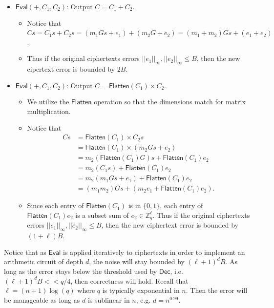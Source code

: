 \documentclass[12pt]{tufte-book}
\begin{document}
\begin{itemize}
    \item $\mathsf{Eval}(+, C_1, C_2)$: Output $C = C_1 + C_2$. 

    \begin{itemize}
        \item Notice that $Cs = C_1s + C_2s = (m_1 Gs + e_1) + (m_2 G + e_2) = (m_1 + m_2) Gs + (e_1 + e_2)$. 

        \item Thus if the original ciphertexts errors $||e_1||_{\infty}, ||e_2||_{\infty} \leq B$, then the new cipertext error is bounded by $2B$. 
    \end{itemize} 

    \item $\mathsf{Eval}(+, C_1, C_2)$: Output $C = \mathsf{Flatten}(C_1) \times C_2$. 

    \begin{itemize}
        \item We utilize the $\mathsf{Flatten}$ operation so that the dimensions match for matrix multiplication. 

        \item Notice that 
        \begin{align*}
            Cs & = \mathsf{Flatten}(C_1) \times C_2 s \\
            & = \mathsf{Flatten}(C_1) \times (m_2 G s + e_2) \\ 
            & = m_2 (\mathsf{Flatten}(C_1) G) s + \mathsf{Flatten}(C_1) e_2 \\ 
            & = m_2 (C_1 s) + \mathsf{Flatten}(C_1) e_2 \\
            & = m_2 (m_1 Gs + e_1) + \mathsf{Flatten}(C_1) e_2 \\ 
            & = (m_1 m_2) G s + (m_2 e_1 + \mathsf{Flatten}(C_1) e_2). 
        \end{align*} 

        \item Since each entry of $\mathsf{Flatten}(C_1)$ is in $\{0,1\}$, each entry of $\mathsf{Flatten}(C_1) e_2$ is a subset sum of $e_2 \in \mathbb{Z}_q^{\ell}$. Thus if the original ciphertexts errors $||e_1||_{\infty}, ||e_2||_{\infty} \leq B$, then the new ciphertext error is bounded by $(1+\ell)B$. 
    \end{itemize}
\end{itemize}



Notice that as $\mathsf{Eval}$ is applied iteratively to ciphertexts in order to implement an arithmetic circuit of depth $d$, the noise will stay bounded by $(\ell+1)^d B$. 
As long as the error stays below the threshold used by $\mathsf{Dec}$, i.e. $(\ell+1)^d B << q/4$, then correctness will hold. 
Recall that $\ell = (n+1) \log(q)$ where $q$ is typically exponential in $n$. 
Then the error will be manageable as long as $d$ is sublinear in $n$, e.g. $d = n^{0.99}$. 
\end{document}
